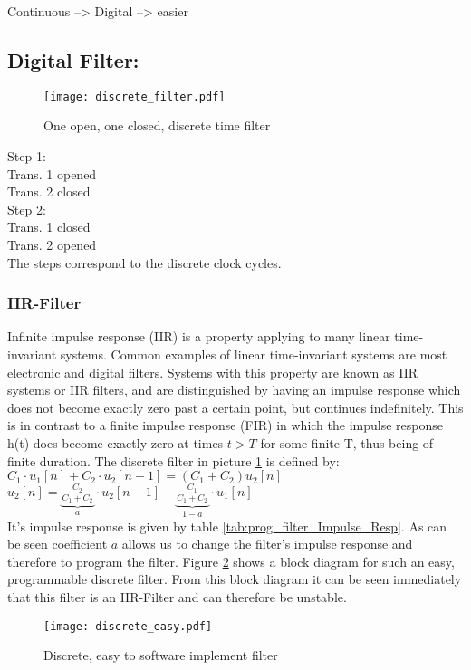 Continuous --> Digital --> easier 

\subsection{Digital Filter:}
\begin{figure}[H]
	\centering
	\texttt{[image: discrete\_filter.pdf]}
	\caption{One open, one closed, discrete time filter}
	\label{discretefilter} 
\end{figure}

Step 1: 	 \\Trans. 1 opened\\
			 Trans. 2 closed\\

Step 2:      \\Trans. 1 closed\\
			 Trans. 2 opened\\

The steps correspond to the discrete clock cycles.


\subsubsection{IIR-Filter}
Infinite impulse response (IIR) is a property applying to many linear time-invariant systems. Common examples of linear time-invariant systems are most electronic and digital filters. Systems with this property are known as IIR systems or IIR filters, and are distinguished by having an impulse response which does not become exactly zero past a certain point, but continues indefinitely. This is in contrast to a finite impulse response (FIR) in which the impulse response h(t) does become exactly zero at times $t > T$ for some finite T, thus being of finite duration.
The discrete filter in picture \ref{discretefilter} is defined by:\\ 
$C_1\cdot u_1[n] + C_2\cdot u_2[n-1] = (C_1+C_2 )u_2[n]$\\ 
$u_2[n]= \underbrace{\frac{C_2}{C_1+C_2}}_{a}\cdot u_2[n-1] + \underbrace{\frac{C_1}{C_1+C_2}}_{1-a}\cdot u_1[n]$\\
It's impulse response is given by table \ref{tab:prog_filter_Impulse_Resp}. As can be seen coefficient $a$ allows us to change the filter's impulse response and therefore to program the filter. Figure \ref{discreteeasy} shows a block diagram for such an easy, programmable discrete filter. From this block diagram it can be seen immediately that this filter is an IIR-Filter and can therefore be unstable.
\begin{figure}[H]
	\centering
	\texttt{[image: discrete\_easy.pdf]}
	\caption{Discrete, easy to software implement filter}
	\label{discreteeasy} 
\end{figure}

